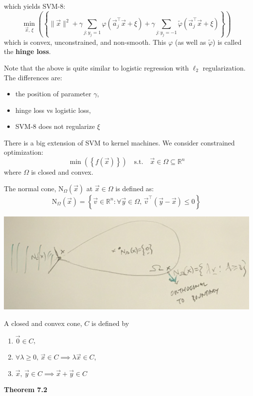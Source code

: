 \documentclass{article}
\newcommand{\R}{\mathbb{R}}
\begin{document}
which yields SVM-8:
\[
    \min_{\vec{x},\, \xi}\left(\left\{\|\vec{x}\|^2 + \gamma \sum_{j : y_j = 1} \varphi\left(\vec{a}_j^\top\vec{x} + \xi\right) + \gamma \sum_{j : y_j = -1} \widetilde{\varphi}\left(\vec{a}_j^\top\vec{x} + \xi\right)\right\}\right)
\]
which is convex, unconstrained, and non-smooth. This $\varphi$ (as well as $\widetilde{\varphi}$) is called the \textbf{hinge loss}.

Note that the above is quite similar to logistic regression with $\ell_2$ regularization. The differences are:
\begin{itemize}
    \item the position of parameter $\gamma$,
    \item hinge loss vs logistic loss,
    \item SVM-8 does not regularize $\xi$
\end{itemize}
There is a big extension of SVM to kernel machines. We consider constrained optimization:
\[
    \min\left(\left\{f(\vec{x})\right\}\right) \quad \text{s.t.} \quad \vec{x} \in \Omega \subseteq \R^n
\]
where $\Omega$ is closed and convex.

The normal cone, $\text{N}_{\Omega}(\vec{x})$ at $\vec{x} \in \Omega$ is defined as:
\[
    \text{N}_{\Omega}(\vec{x}) = \left\{\vec{v} \in \R^n : \forall \vec{y} \in \Omega,\, \vec{v}^\top(\vec{y} - \vec{x}) \leq 0\right\}
\]
\begin{center}
    \includegraphics*[scale=0.12]{normal_cone.JPG}
\end{center}
A closed and convex cone, $C$ is defined by
\begin{enumerate}
    \item $\vec{0} \in C$,
    \item $\forall \lambda \geq 0,\, \vec{x} \in C \implies \lambda\vec{x} \in C$,
    \item $\vec{x},\, \vec{y} \in C \implies \vec{x} + \vec{y} \in C$
\end{enumerate}

\textbf{Theorem 7.2}
\end{document}
